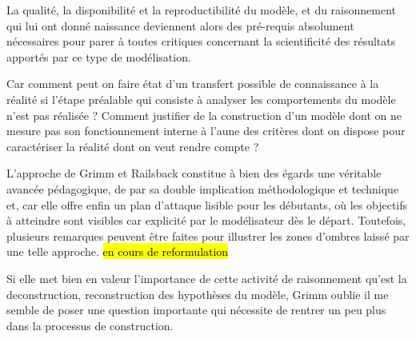 La qualité, la disponibilité et la reproductibilité du modèle, et du raisonnement qui lui ont donné naissance deviennent alors des pré-requis absolument nécessaires pour parer à toutes critiques concernant la scientificité des résultats apportés par ce type de modélisation. %

Car comment peut on faire état d'un transfert possible de connaissance à la réalité si l'étape préalable qui consiste à analyser les comportements du modèle n'est pas réalisée ? Comment justifier de la construction d'un modèle dont on ne mesure pas son fonctionnement interne à l'aune des critères dont on dispose pour caractériser la réalité dont on veut rendre compte ?

L'approche de Grimm et Railsback constitue à bien des égards une véritable avancée pédagogique, de par sa double implication méthodologique et technique et, car elle offre enfin un plan d'attaque lisible pour les débutants, où les objectifs à atteindre sont visibles car explicité par le modélisateur dès le départ. Toutefois, plusieurs remarques peuvent être faites pour illustrer les zones d'ombres laissé par une telle approche. \hl{en cours de reformulation}

Si elle met bien en valeur l'importance de cette activité de raisonnement qu'est la deconstruction, reconstruction des hypothèses du modèle, Grimm oublie il me semble de poser une question importante qui nécessite de rentrer un peu plus dans la processus de construction. %

